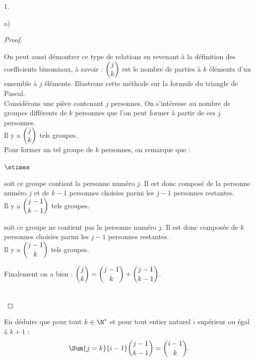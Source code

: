 \begin{noliste}{1.}
\begin{noliste}{a)}
\begin{proof}
      \begin{remark}
        On peut aussi démontrer ce type de relations en revenant à la
        définition des coefficients binomiaux, à savoir :
        $\dbinom{j}{k}$ est le nombre de parties à $k$ éléments d'un
        ensemble à $j$ éléments. Illustrons cette
        méthode sur la formule du triangle de Pascal.\\[.2cm]
        Considérons une pièce contenant $j$ personnes. On s'intéresse
        au nombre de groupes différents de $k$ personnes
        que l'on peut former à partir de ces $j$ personnes.\\
        Il y a $\dbinom{j}{k}$ tels groupes.\\
        Pour former un tel groupe de $k$ personnes, on remarque que :
        \begin{noliste}{$\stimes$}
        \item soit ce groupe contient la personne numéro $j$. Il est
          donc composé de la personne numéro $j$ et de $k-1$ personnes
          choisies parmi les $j-1$ personnes restantes.\\[.1cm]
          Il y a $\dbinom{j-1}{k-1}$ tels groupes.
        \item soit ce groupe ne contient pas la personne numéro
          $j$. Il est donc composée de $k$ personnes choisies parmi
          les $j-1$ personnes restantes.\\[.1cm]
          Il y a $\dbinom{j-1}{k}$ tels groupes.
        \end{noliste}
        Finalement on a bien : $\dbinom{j}{k}=
        \dbinom{j-1}{k}+\dbinom{j-1}{k-1}$.      
      \end{remark}~\\[-1.4cm]
    \end{proof}

	
  \item En déduire que pour tout $k\in\N^*$ et pour tout entier
    naturel $i$ supérieur ou égal à $k+1$ :
    \[
    \Sum{j=k}{i-1} \dbinom{j-1}{k-1} = \dbinom{i-1}{k}.
    \]
    

\end{noliste}
\end{noliste}
